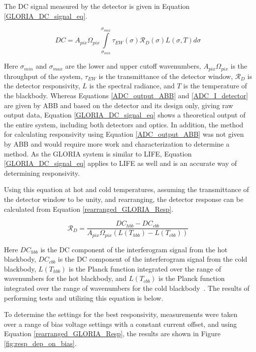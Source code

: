 The DC signal measured by the detector is given in Equation \ref{GLORIA_DC_signal_eq}.

\begin{equation} \label{GLORIA_DC_signal_eq}
    DC = A_{pix}\Omega_{pix}\int\limits_{\sigma_{min}}^{\sigma_{max}}\tau_{EW}(\sigma)\mathcal{R}_D(\sigma)L(\sigma, T)d\sigma
\end{equation}

Here $\sigma_{min}$ and $\sigma_{max}$ are the lower and upper cutoff wavenumbers, $A_{pix}\Omega_{pix}$ is the throughput of the system, $\tau_{EW}$ is the transmittance of the detector window, $\mathcal{R}_D$ is the detector responsivity, $L$ is the spectral radiance, and $T$ is the temperature of the blackbody. Whereas Equations \ref{ADC_output_ABB} and \ref{ADC_I_detector} are given by ABB and based on the detector and its design only, giving raw output data, Equation \ref{GLORIA_DC_signal_eq} shows a theoretical output of the entire system, including both detectors and optics. In addition, the method for calculating responsivity using Equation \ref{ADC_output_ABB} was not given by ABB and would require more work and characterization to determine a method. As the GLORIA system is similar to LIFE, Equation \ref{GLORIA_DC_signal_eq} applies to LIFE as well and is an accurate way of determining responsivity.

Using this equation at hot and cold temperatures, assuming the transmittance of the detector window to be unity, and rearranging, the detector response can be calculated from Equation \ref{rearranged_GLORIA_Resp}.

\begin{equation} \label{rearranged_GLORIA_Resp}
    \mathcal{R}_D = \frac{DC_{hbb} - DC_{cbb}}{A_{pix}\Omega_{pix}(L(T_{hbb})-L(T_{cbb}))}
\end{equation}

Here $DC_{hbb}$ is the DC component of the interferogram signal from the hot blackbody, $DC_{cbb}$ is the DC component of the interferogram signal from the cold blackbody, $L(T_{hbb})$ is the Planck function integrated over the range of wavenumbers for the hot blackbody, and $L(T_{cbb})$ is the Planck function integrated over the range of wavenumbers for the cold blackbody~\citep{GLORIA_PhD}. The results of performing tests and utilizing this equation is below.

To determine the settings for the best responsivity, measurements were taken over a range of bias voltage settings with a constant current offset, and using Equation \ref{rearranged_GLORIA_Resp}, the results are shown in Figure \ref{fig:resp_dep_on_bias}.

